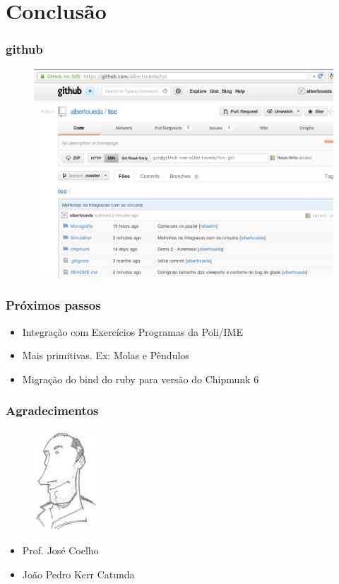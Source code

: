 \documentclass{beamer}
\begin{document}
\section{Conclusão}
\begin{frame}
  \frametitle{github}
  \begin{figure}
    \includegraphics[scale=0.3]{github.png}
  \end{figure}
\end{frame}
\begin{frame}
  \frametitle{Próximos passos}
  \begin{itemize}
    \item Integração com Exercícios Programas da Poli/IME
    \item Mais primitivas. Ex: Molas e Pêndulos
    \item Migração do bind do ruby para versão do Chipmunk 6
  \end{itemize}
\end{frame}
\begin{frame}
  \frametitle{Agradecimentos}
  \begin{figure}
    \includegraphics[scale=1]{coelhof.jpg}
  \end{figure}
  \begin{itemize}
    \item Prof. José Coelho
    \item João Pedro Kerr Catunda
  \end{itemize}
\end{frame}
\end{document}
